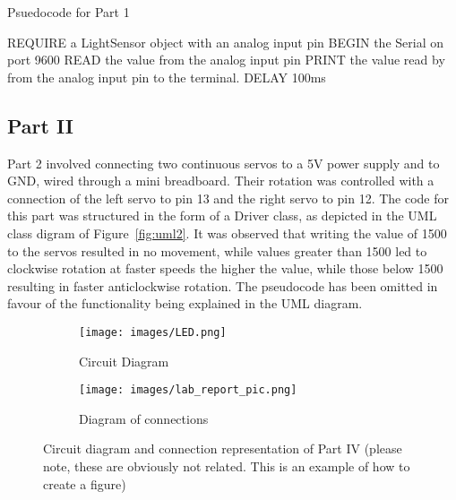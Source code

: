 \documentclass[journal]{IEEEtran}
\begin{document}
\begin{algorithm}
\caption{Psuedocode for Part 1}\label{alg:part1}
\begin{algorithmic}[1]
\State REQUIRE a LightSensor object with an analog input pin
\State BEGIN the Serial on port 9600
\State READ the value from the analog input pin
\State PRINT the value read by from the analog input pin to the terminal.
\State DELAY 100ms
\EndWhile
\end{algorithmic}
\end{algorithm}

\subsection{Part II}\label{Part2Subsection}
Part 2 involved connecting two continuous servos to a 5V power supply and to GND, wired through a mini breadboard. Their rotation was controlled with a connection of the left servo to pin 13 and the right servo to pin 12. The code for this part was structured in the form of a Driver class, as depicted in the UML class digram of Figure~\ref{fig:uml2}. It was observed that writing the value of 1500 to the servos resulted in no movement, while values greater than 1500 led to clockwise rotation at faster speeds the higher the value, while those below 1500 resulting in faster anticlockwise rotation. The pseudocode has been omitted in favour of the functionality being explained in the UML diagram.

\begin{figure}[ht]
    \centering
      \begin{subfigure}[b]{0.2\textwidth}
         \centering
         \texttt{[image: images/LED.png]} 
         \caption{Circuit Diagram}
         \label{fig:Circuit_diagram2}
     \end{subfigure}
     \begin{subfigure}[b]{0.2\textwidth}
         \centering
         \texttt{[image: images/lab\_report\_pic.png]} 
         \caption{Diagram of connections}
         \label{fig:connections2}
     \end{subfigure}  \hfill
    \caption{Circuit diagram and connection representation of Part IV (please note, these are obviously not related. This is an example of how to create a figure)}
    \label{fig:part2}
\end{figure}
\end{document}
